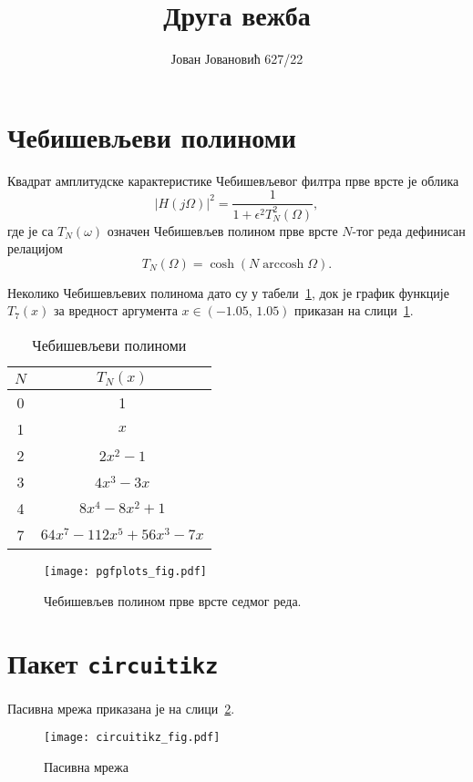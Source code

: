 \documentclass[a4paper, 10pt]{article}
\title{\textbf{Друга вежба}}
\author{Јован Јовановић 627/22}
\date{}
\begin{document}
	\maketitle
	\tableofcontents
	\listoftables
	\listoffigures
	

\clearpage
\section{Чебишевљеви полиноми}


\noindent Квадрат амплитудске карактеристике Чебишевљевог филтра прве врсте је облика
	\begin{equation}
		\left|H\left(j\Omega\right)\right|^2=\frac{1}{1+\epsilon^2T^2_N\left(\Omega\right)},
	\end{equation}
где је са $T_N\left(\omega\right)$ означен Чебишевљев полином прве врсте $N$-тог реда дефинисан релацијом
\[
T_N\left(\Omega\right)=\cosh\left(N\operatorname{arccosh}\Omega\right).
\]

Неколико Чебишевљевих полинома дато су у табели~\ref{Tab:cheb}, док је график функције $T_7\left(x\right)$ за вредност аргумента $x\in\left(-1.05,\,1.05\right)$ приказан на слици~\ref{Fig:cheb}.
\begin{table}[!h]
	\centering
	\caption{Чебишевљеви полиноми}
	\begin{tabular}{c|c}
		$N$ & $T_N\left(x\right)$\\
		\hline
		0 & 1\\
		1 & $x$\\
		2 & $2x^2 - 1$\\
		3 & $4x^3-3x$\\
		4 & $8x^4-8x^2+1$\\
		7 & $64x^7-112x^5+56x^3-7x$
	\end{tabular}
	\label{Tab:cheb}
\end{table}

\begin{figure}[!h]
	\centering
	\texttt{[image: pgfplots\_fig.pdf]}
	\caption{Чебишевљев полином прве врсте седмог реда.}
	\label{Fig:cheb}
\end{figure}

\clearpage

\section{Пакет \texttt{circuitikz}}
Пасивна мрежа приказана је на слици~\ref{Fig:circuitikz}.
\begin{figure}[!h]
	\centering
	\texttt{[image: circuitikz\_fig.pdf]}
	\caption{Пасивна мрежа}
	\label{Fig:circuitikz}
\end{figure}
\end{document}
